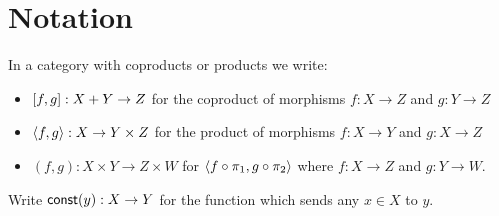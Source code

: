 \section{Notation}

In a category with coproducts or products we write:
\begin{itemize}
\item $[f, g]: X + Y \to Z$ for the coproduct of morphisms $f: X \to Z$ and $g: Y \to Z$
\item $\langle f, g\rangle: X \to Y \times Z$ for the product of morphisms $f: X \to Y$ and $g: X \to Z$
\item $(f,g): X \times Y \to Z \times W$ for $\langle f \circ \pi_1, g \circ \pi_2\rangle$ where $f: X \to Z$ and $g: Y \to W$.
\end{itemize}

Write $\mathsf{const}(y): X \to Y$ for the function which sends any $x \in X$ to $y$.
